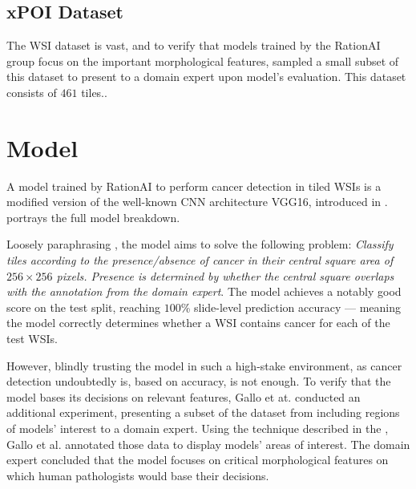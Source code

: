 \subsection*{xPOI Dataset}\label{xpoi-dataset}

The WSI dataset is vast, and to verify that models trained by the RationAI group focus on the important morphological features, \cite{gallo} sampled a small subset of this dataset to present to a domain expert upon model's evaluation.
This dataset consists of $461$ tiles..

\section{Model}\label{model}

A model trained by RationAI to perform cancer detection in tiled WSIs is a modified version of the well-known CNN architecture VGG16, introduced in \cite{vgg16}.
 portrays the full model breakdown.

Loosely paraphrasing \cite{gallo}, the model aims to solve the following problem: \emph{Classify tiles according to the presence/absence of cancer in their central square area of $256 \times 256 $ pixels. Presence is determined by whether the central square overlaps with the annotation from the domain expert}. The model achieves a notably good score on the test split, reaching $100$\% slide-level prediction accuracy --- meaning the model correctly determines whether a WSI contains cancer for each of the test WSIs.

However, blindly trusting the model in such a high-stake environment, as cancer detection undoubtedly is, based on accuracy, is not enough.
To verify that the model bases its decisions on relevant features, Gallo et at. conducted an additional experiment, presenting a subset of the dataset from  including regions of models' interest to a domain expert.
Using the technique described in the , Gallo et al. annotated those data to display models' areas of interest.
The domain expert concluded that the model focuses on critical morphological features \cite{gallo} on which human pathologists would base their decisions.

